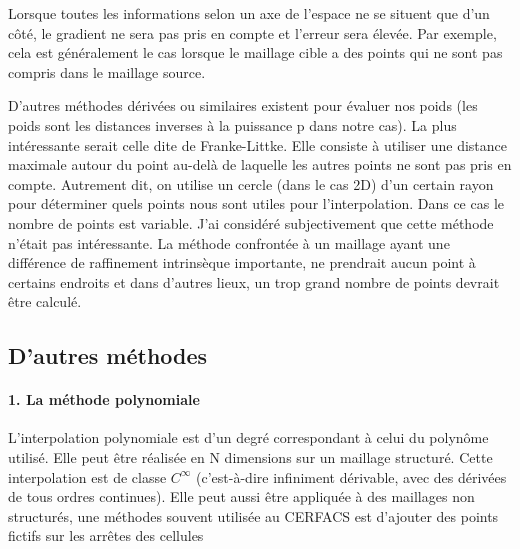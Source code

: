 Lorsque toutes les informations selon un axe de l'espace ne se situent que d'un côté, le gradient ne sera pas pris en compte et l'erreur sera élevée. Par exemple, cela est généralement le cas lorsque le maillage cible a des points qui ne sont pas compris dans le maillage source.

D'autres méthodes dérivées ou similaires existent pour évaluer nos poids (les poids sont les distances inverses à la puissance p dans notre cas). La plus intéressante serait celle dite de Franke-Littke. Elle consiste à utiliser une distance maximale autour du point au-delà de laquelle les autres points ne sont pas pris en compte. Autrement dit, on utilise un cercle (dans le cas 2D) d'un certain rayon pour déterminer quels points nous sont utiles pour l'interpolation. Dans ce cas le nombre de points est variable.
J'ai considéré subjectivement que cette méthode n'était pas intéressante. La méthode confrontée à un maillage ayant une différence de raffinement intrinsèque importante, ne prendrait aucun point à certains endroits et dans d'autres lieux, un trop grand nombre de points devrait être calculé.

\vspace{0,5 cm}


\newpage
\subsection{D'autres méthodes}
\paragraph{1. La méthode polynomiale}
\phantom{-}
\newline
L'interpolation polynomiale est d'un degré correspondant à celui du polynôme utilisé. Elle peut être réalisée en N dimensions sur un maillage structuré. Cette interpolation est de classe \(C^\infty\) (c'est-à-dire infiniment dérivable, avec des dérivées de tous ordres continues). Elle peut aussi être appliquée à des maillages non structurés, une méthodes souvent utilisée au CERFACS est d'ajouter des points fictifs sur les arrêtes des cellules %

